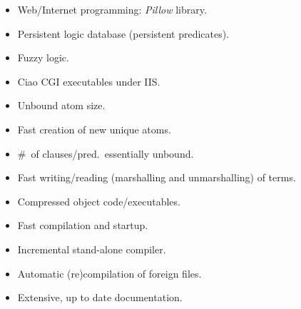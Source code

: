\documentclass{article}
\begin{document}
\begin{itemize}
\item Web/Internet programming: \emph{Pillow} library.
\item Persistent logic database (persistent predicates).
\item Fuzzy logic.
%
\item Ciao CGI executables under IIS.
\item Unbound atom size.
\item Fast creation of new unique atoms.
\item \#~of clauses/pred.~essentially unbound.
\item Fast writing/reading (marshalling and unmarshalling) of terms.
\item Compressed object code/executables. %
\item Fast compilation and startup.
\item Incremental stand-alone compiler.
\item Automatic (re)compilation of foreign files.
\item Extensive, up to date documentation.
\end{itemize}
\end{document}

